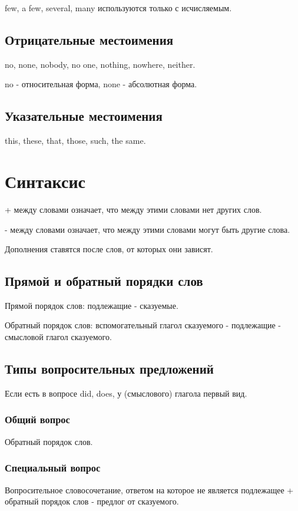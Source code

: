 \documentclass[oneside]{book}
\begin{document}
few, a few, several, many используются только с исчисляемым.

\section{Отрицательные местоимения}
no, none, nobody, no one, nothing, nowhere, neither.

no - относительная форма, none - абсолютная форма.

\section{Указательные местоимения}
this, these, that, those, such, the same.

\chapter{Синтаксис}
+ между словами  означает, что между этими словами нет других слов.

{}-{} между словами  означает, что между этими словами могут быть другие слова.

Дополнения ставятся после слов, от которых они зависят.

\section{Прямой и обратный порядки слов}
Прямой порядок слов: подлежащие - сказуемые.

Обратный порядок слов: вспомогательный глагол сказуемого - подлежащие -
смысловой глагол сказуемого.

\section{Типы вопросительных предложений}
Если есть в вопросе did, does, у (смыслового) глагола первый вид.

\subsection{Общий вопрос}
Обратный порядок слов.

\subsection{Специальный вопрос}
Вопросительное словосочетание, ответом на которое не является подлежащее
+ обратный порядок слов - предлог от сказуемого.
\end{document}
